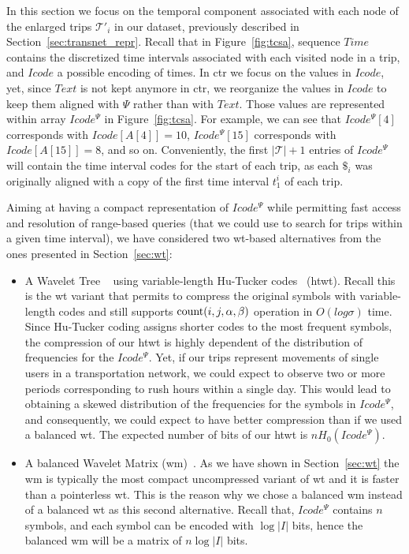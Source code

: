 	In this section we focus on the temporal component associated with each node of the enlarged trips $\mathcal{T}'_i$ 
	in our dataset, previously described in Section~\ref{sec:transnet_repr}. Recall that in Figure~\ref{fig:tcsa}, sequence $Time$ contains the discretized time intervals
	associated with each visited node in a trip, and $Icode$ a possible encoding of times.
	In \gls{ctr} we focus on the values in $Icode$, yet, since $Text$ is not kept anymore in \gls{ctr}, we 
	reorganize the values in $Icode$ to keep them aligned with $\Psi$ rather than with $Text$. Those
	values are represented within array $Icode^{\Psi}$ in Figure~\ref{fig:tcsa}. 
	For example, we can see that $Icode^{\Psi}[4]$ corresponds with $Icode[A[4]]=10$, 
	$Icode^{\Psi}[15]$ corresponds with $Icode[A[15]]=8$, and so on. Conveniently, the first $|\mathcal{T}| + 1$ entries of $Icode^{\Psi}$ will contain the time interval codes for the start of each trip, as each $\$_i$ was originally aligned with a copy of the first time interval $t^i_1$ of each trip.

	Aiming at having a compact representation of $Icode^{\Psi}$ while permitting fast 
	access and resolution of range-based queries (that we could use to search for trips within 
	a given time interval), we have considered two \gls{wt}-based alternatives from the ones presented in Section~\ref{sec:wt}:

	\begin{itemize}
	  \item A Wavelet Tree ~\cite{WT03} using variable-length Hu-Tucker codes~\cite{hu1971optimal} (\gls{htwt}).
	  Recall this is the \gls{wt} variant that permits to compress the original symbols with variable-length codes and 
	  still supports $\operatorname{count}(i,j,\alpha,\beta)$ operation in $O(log\sigma)$ time. Since Hu-Tucker coding assigns shorter codes
	  to the most frequent symbols, the compression of our \gls{htwt} is highly dependent of the distribution
	  of frequencies for the $Icode^{\Psi}$. Yet, if our 
	  trips represent movements of single users in a transportation network, we could expect to observe two or more periods 
	  corresponding to rush hours within a single day. This would lead to obtaining a skewed distribution of the frequencies 
	  for the symbols in $Icode^{\Psi}$, and consequently, we could expect to have better compression than if we used a 
	  balanced \gls{wt}. The expected number of bits of our \gls{htwt} is $nH_0(Icode^{\Psi})$.

	  \item A balanced Wavelet Matrix (\gls{wm})~\cite{CNO15}. As we have shown in Section~\ref{sec:wt} the \gls{wm} is typically the most
	  compact uncompressed variant of \gls{wt} and it is faster than a pointerless \gls{wt}. This is the reason why we chose
	  a balanced \gls{wm} instead of a balanced \gls{wt} as this second alternative. Recall that, $Icode^{\Psi}$ contains $n$ symbols, 
	  and each symbol can be encoded with $\log  |I|$ bits, hence the 
	  balanced \gls{wm} will be a matrix of $n  \log|I|$ bits.
	\end{itemize}
	
